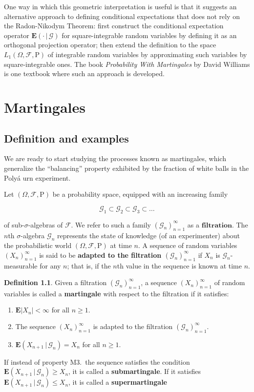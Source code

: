 \documentclass[11pt]{report}
\theoremstyle{plain}
\theoremstyle{definition}
\newtheorem{defn}[thm]{Definition}
\begin{document}
One way in which this geometric interpretation is useful is that it suggests an alternative approach to defining conditional expectations that does not rely on the Radon-Nikodym Theorem: first construct the conditional expectation operator $\mathbf{E}\left(\cdot\,|\,\mathcal{G}\right)$ for square-integrable random variables by defining it as an orthogonal projection operator; then extend the definition to the space $L_1(\Omega,\mathcal{F},\mathrm{P})$ of integrable random variables by approximating such variables by square-integrable ones. The book \emph{Probability With Martingales} by David Williams is one textbook where such an approach is developed.

\chapter{Martingales}

\section{Definition and examples}
We are ready to start studying the processes known as martingales, which generalize the ``balancing'' property exhibited by the fraction of white balls in the Poly\'a urn experiment.

Let $(\Omega, \mathcal{F}, \mathrm{P})$ be a probability space, equipped with an increasing family

\[
\mathcal{G}_1 \subset \mathcal{G}_2 \subset \mathcal{G}_3 \subset \ldots
\]

of sub-$\sigma$-algebras of $\mathcal{F}$. We refer to such a family $(\mathcal{G}_n)_{n=1}^\infty$ as a $\textbf{filtration}$. The $n$th $\sigma$-algebra $\mathcal{G}_n$ represents the state of knowledge (of an experimenter) about the probabilistic world $(\Omega, \mathcal{F}, \mathrm{P})$ at time $n$. A sequence of random variables $(X_n)_{n=1}^\infty$ is said to be \textbf{adapted to the filtration $(\mathcal{G}_n)_{n=1}^\infty$} if $X_n$ is $\mathcal{G}_n$-measurable for any $n$; that is, if the $n$th value in the sequence is known at time $n$.

\begin{defn}
Given a filtration $(\mathcal{G}_n)_{n=1}^\infty$, a sequence $(X_n)_{n=1}^\infty$ of random variables is called a \textbf{martingale} with respect to the filtration if it satisfies:

\begin{enumerate}[label=\arabic*.]
\item $\mathbf{E}|X_n|<\infty$ for all $n\ge1$.
\item The sequence $(X_n)_{n=1}^\infty$ is adapted to the filtration $(\mathcal{G}_n)_{n=1}^\infty$.
\item $\mathbf{E}\left(X_{n+1}\,|\,\mathcal{G}_n\right) = X_n$ for all $n\ge 1$.
\end{enumerate}

If instead of property M3.\ the sequence satisfies the condition $\mathbf{E}\left(X_{n+1}\,|\,\mathcal{G}_n\right) \ge X_n$, it is called a \textbf{submartingale}. If it satisfies $\mathbf{E}\left(X_{n+1}\,|\,\mathcal{G}_n\right) \le X_n$, it is called a \textbf{supermartingale}
\end{defn}
\end{document}
